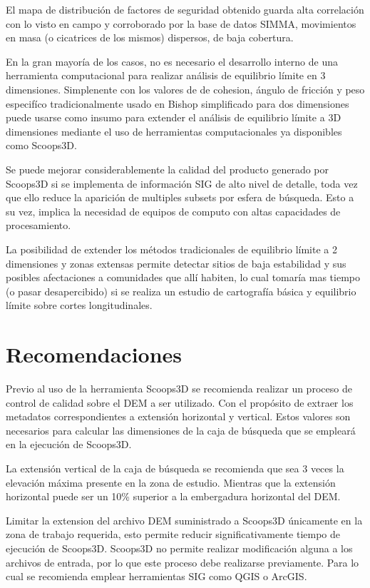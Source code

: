 El mapa de distribuci\'on de factores de seguridad obtenido guarda alta correlaci\'on con lo visto en campo y corroborado por la base de datos SIMMA, movimientos en masa (o cicatrices de los mismos) dispersos, de baja cobertura.

En la gran mayor\'ia de los casos, no es necesario el desarrollo interno de una herramienta computacional para realizar an\'alisis de equilibrio l\'imite en 3 dimensiones. Simplenente con los valores de de cohesion, \'angulo de fricci\'on y peso especif\'ico tradicionalmente usado en Bishop simplificado para dos dimensiones puede usarse como insumo para extender el an\'alisis  de equilibrio l\'imite a 3D dimensiones mediante el uso de herramientas computacionales ya disponibles como Scoops3D.

Se puede mejorar considerablemente la calidad del producto generado por Scoops3D si se implementa de informaci\'on SIG de alto nivel de detalle, toda vez que ello reduce la aparici\'on de multiples subsets por esfera de b\'usqueda. Esto a su vez, implica la necesidad de equipos de computo con altas capacidades de procesamiento.


La posibilidad de extender los m\'etodos tradicionales de equilibrio l\'imite a 2 dimensiones y zonas extensas permite detectar sitios de baja estabilidad y sus posibles afectaciones a comunidades que all\'i habiten, lo cual tomar\'ia mas tiempo (o pasar desapercibido) si se realiza un estudio de cartograf\'ia b\'asica y equilibrio l\'imite sobre cortes longitudinales.


\section{Recomendaciones}

Previo al uso de la herramienta Scoops3D se recomienda  realizar un proceso de control de calidad sobre el DEM a ser utilizado. Con el prop\'osito de extraer los metadatos correspondientes a extensi\'on horizontal y vertical. Estos valores son necesarios para calcular las dimensiones de la caja de b\'usqueda que se emplear\'a en la ejecuci\'on de Scoops3D.


La extensi\'on vertical de la caja de b\'usqueda se recomienda que sea 3 veces la elevaci\'on m\'axima presente en la zona de estudio. Mientras que la extensi\'on horizontal puede ser un 10\% superior a la embergadura horizontal del DEM.
  
Limitar la extension del archivo DEM suministrado a  Scoops3D \'unicamente en la zona de trabajo requerida, esto permite reducir significativamente tiempo de ejecuci\'on de Scoops3D. Scoops3D no permite realizar modificaci\'on alguna a los archivos de entrada, por lo que este proceso debe realizarse previamente. Para lo cual se recomienda emplear herramientas SIG como QGIS o ArcGIS.


